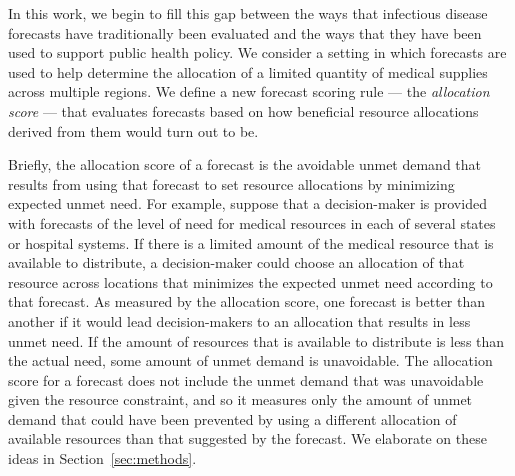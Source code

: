 \documentclass{article}
\begin{document}
In this work, we begin to fill this gap between the ways that infectious disease forecasts have traditionally been evaluated and the ways that they have been used to support public health policy.
We consider a setting in which forecasts are used to help determine the allocation of a limited quantity of medical supplies across multiple regions.
We define a new forecast scoring rule --- the {\em allocation score} --- that evaluates forecasts based on how beneficial resource allocations derived from them would turn out to be.

Briefly, the allocation score of a forecast is the avoidable unmet demand that results from using that forecast to set resource allocations by minimizing expected unmet need.
For example, suppose that a decision-maker is provided with forecasts of the level of need for medical resources in each of several states or hospital systems.
If there is a limited amount of the medical resource that is available to distribute, a decision-maker could choose an allocation of that resource across locations that minimizes the expected unmet need according to that forecast.
As measured by the allocation score, one forecast is better than another if it would lead decision-makers to an allocation that results in less unmet need.
If the amount of resources that is available to distribute is less than the actual need, some amount of unmet demand is unavoidable.
The allocation score for a forecast does not include the unmet demand that was unavoidable given the resource constraint, and so it measures only the amount of unmet demand that could have been prevented by using a different allocation of available resources than that suggested by the forecast.
We elaborate on these ideas in Section~\ref{sec:methods}.
\end{document}
